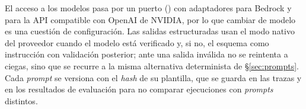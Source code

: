 El acceso a los modelos pasa por un puerto () con adaptadores para Bedrock y
para la API compatible con OpenAI de NVIDIA, por lo que cambiar de modelo es una cuestión de configuración. Las
salidas estructuradas usan el modo nativo del proveedor cuando el modelo está verificado
y, si no, el esquema como instrucción con validación posterior; ante una salida inválida no se
reintenta a ciegas, sino que se recurre a la misma alternativa determinista de §\ref{sec:prompts}.
Cada \emph{prompt} se versiona con el \emph{hash} de su plantilla, que se
guarda en las trazas y en los resultados de evaluación para no comparar ejecuciones con
\emph{prompts} distintos.

